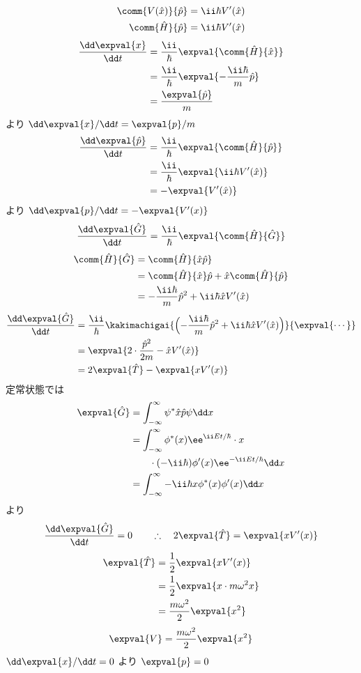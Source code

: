 \begin{align*}
\comm{V(\hat{x})}{\hat{p}}&=\ii\hbar V'(\hat{x})\\
\comm{\hat{H}}{\hat{p}}&=\ii\hbar V'(\hat{x})
\end{align*}
\begin{align*}
\frac{\dd\expval{x}}{\dd t}&=\frac{\ii}{\hbar}\expval{\comm{\hat{H}}{\hat{x}}}\\
&=\frac{\ii}{\hbar}\expval{-\frac{\ii\hbar}{m}\hat{p}}\\
&=\frac{\expval{\hat{p}}}{m}
\end{align*}
より $\dd\expval{x}/\dd t=\expval{p}/m$
\begin{align*}
\frac{\dd\expval{\hat{p}}}{\dd t}&=\frac{\ii}{\hbar}\expval{\comm{\hat{H}}{\hat{p}}}\\
&=\frac{\ii}{\hbar}\expval{\ii\hbar V'(\hat{x})}\\
&=-\expval{V'(\hat{x})}
\end{align*}
より $\dd\expval{p}/\dd t=-\expval{V'(x)}$
\[ \frac{\dd\expval{\hat{G}}}{\dd t}=\frac{\ii}{\hbar}\expval{\comm{\hat{H}}{\hat{G}}} \]
\begin{align*}
\comm{\hat{H}}{\hat{G}}&=\comm{\hat{H}}{\hat{x}\hat{p}}\\
&=\comm{\hat{H}}{\hat{x}}\hat{p}+\hat{x}\comm{\hat{H}}{\hat{p}}\\
&=-\frac{\ii\hbar}{m}\hat{p}^{2}+\ii\hbar\hat{x}V'(\hat{x})
\end{align*}
\begin{align*}
\frac{\dd\expval{\hat{G}}}{\dd t}&=\frac{\ii}{\hbar}\kakimachigai{\Bigl(-\frac{\ii\hbar}{m}\hat{p}^{2}+\ii\hbar\hat{x}V'(\hat{x})\Bigr)}{\expval{\cdots}}\\
&=\expval{2\cdot\frac{\hat{p}^{2}}{2m}-\hat{x}V'(\hat{x})}\\
&=2\expval{\hat{T}}-\expval{xV'(x)}
\end{align*}
定常状態では
\begin{align*}
\expval{\hat{G}}&=\int_{-\infty}^{\infty}\psi^{*}\hat{x}\hat{p}\psi\dd x\\
&=\int_{-\infty}^{\infty}\phi^{*}(x)\ee^{\ii Et/\hbar}\cdot x\\
&\qquad\cdot(-\ii\hbar)\phi'(x)\ee^{-\ii Et/\hbar}\dd x\\
&=\int_{-\infty}^{\infty}-\ii\hbar x\phi^{*}(x)\phi'(x)\dd x
\end{align*}
より
\[ \frac{\dd\expval{\hat{G}}}{\dd t}=0\qquad\therefore\quad2\expval{\hat{T}}=\expval{xV'(x)} \]
\begin{align*}
\expval{\hat{T}}&=\frac{1}{2}\expval{xV'(x)}\\
&=\frac{1}{2}\expval{x\cdot m\omega^{2}x}\\
&=\frac{m\omega^{2}}{2}\expval{x^{2}}
\end{align*}
\[ \expval{V}=\frac{m\omega^{2}}{2}\expval{x^{2}} \]
$\dd\expval{x}/\dd t=0$ より $\expval{p}=0$

